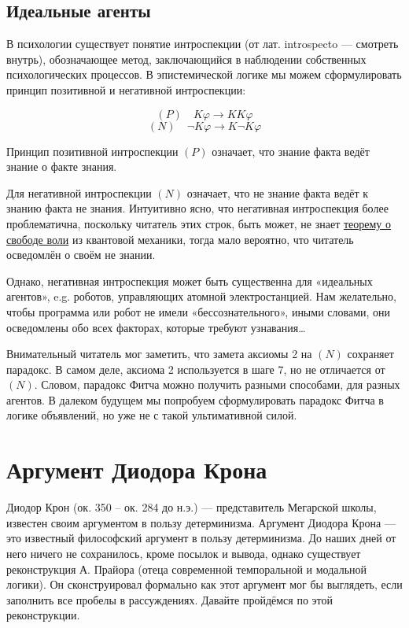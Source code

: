\documentclass[openany]{book}
\theoremstyle{plain}
\theoremstyle{definition}
\begin{document}
\subsection{ Идеальные агенты }

В психологии существует понятие интроспекции (от лат. introspecto — смотреть внутрь), обозначающее метод, заключающийся в наблюдении собственных психологических процессов. В эпистемической логике мы можем сформулировать принцип позитивной и негативной интроспекции:

$$(P) \quad K \varphi \to K K \varphi$$
$$(N) \quad \neg K \varphi \to K \neg K \varphi$$

Принцип позитивной интроспекции \((P)\) означает, что знание факта ведёт знание о факте знания.

Для негативной интроспекции \((N)\) означает, что не знание факта ведёт к знанию факта не знания. Интуитивно ясно, что негативная интроспекция более проблематична, поскольку читатель этих строк, быть может, не знает \href{https://ru.wikipedia.org/wiki/Теорема_о_свободе_воли}{теорему о свободе воли} из квантовой механики, тогда мало вероятно, что читатель осведомлён о своём не знании. 

Однако, негативная интроспекция может быть существенна для «идеальных агентов», e.g. роботов, управляющих атомной электростанцией. Нам желательно, чтобы программа или робот не имели «бессознательного», иными словами, они осведомлены обо всех факторах, которые требуют узнавания\dots

Внимательный читатель мог заметить, что замета аксиомы 2 на \((N)\) сохраняет парадокс. В самом деле, аксиома 2 используется в шаге 7, но не отличается от \((N)\). Словом, парадокс Фитча можно получить разными способами, для разных агентов. В далеком будущем мы попробуем сформулировать парадокс Фитча в логике объявлений, но уже не с такой ультимативной силой.

\section{ Аргумент Диодора Крона }

Диодор Крон (ок. 350 -- ок. 284 до н.э.) --- представитель Мегарской школы, известен своим аргументом в пользу детерминизма. Аргумент Диодора Крона --- это известный философский аргумент в пользу детерминизма. До наших дней от него ничего не сохранилось, кроме посылок и вывода, однако существует реконструкция А. Прайора (отеца современной темпоральной и модальной логики). Он сконструировал формально как этот аргумент мог бы выглядеть, если заполнить все пробелы в рассуждениях. Давайте пройдёмся по этой реконструкции.
\end{document}
